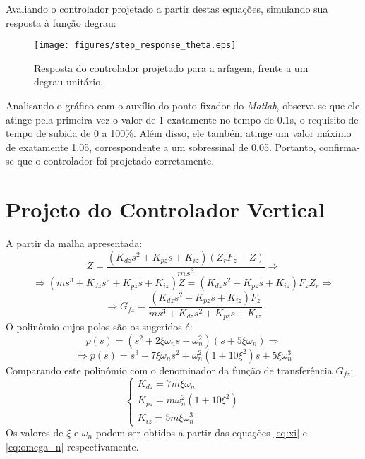 \documentclass[a4paper]{article}
\begin{document}
	Avaliando o controlador projetado a partir destas equa\c{c}\~oes, simulando sua resposta
	\`a fun\c{c}\~ao degrau:
	\begin{figure}[H]
		\centering
		\texttt{[image: figures/step\_response\_theta.eps]}
		\caption{Resposta do controlador projetado para a arfagem, frente a um degrau unit\'ario.}
	\end{figure}
	Analisando o gr\'afico com o aux\'ilio do ponto fixador do \textit{Matlab}, observa-se que
	ele atinge pela primeira vez o valor de 1 exatamente no tempo de 0.1s, o requisito de tempo
	de subida de 0 a 100\%. Al\'em disso, ele tamb\'em atinge um valor m\'aximo de exatamente
	1.05, correspondente a um sobressinal de 0.05. Portanto, confirma-se que o controlador
	foi projetado corretamente.
	\section{Projeto do Controlador Vertical}
	A partir da malha apresentada:
	\begin{equation}
		Z = \frac{(K_{dz}s^2 + K_{pz}s + K_{iz})(Z_rF_z - Z)}{ms^3} \Rightarrow
		\nonumber
	\end{equation}
	\begin{equation}
		\Rightarrow
		(ms^3 + K_{dz}s^2 + K_{pz}s + K_{iz})Z = (K_{dz}s^2 + K_{pz}s + K_{iz})F_zZ_r
		\Rightarrow
		\nonumber
	\end{equation}
	\begin{equation}
		\Rightarrow
		G_{fz} = \frac{(K_{dz}s^2 + K_{pz}s + K_{iz})F_z}{ms^3 + K_{dz}s^2 + K_{pz}s + K_{iz}}
		\nonumber
	\end{equation}
	O polin\^omio cujos polos s\~ao os sugeridos \'e:
	\begin{equation}
		p(s) = (s^2 + 2\xi\omega_ns + \omega_n^2)(s + 5\xi\omega_n) \Rightarrow
		\nonumber
	\end{equation}
	\begin{equation}
		\Rightarrow p(s) = s^3 + 7\xi\omega_ns^2 + \omega_n^2(1 + 10\xi^2)s + 5\xi\omega_n^3
		\nonumber
	\end{equation}
	Comparando este polin\^omio com o denominador da fun\c{c}\~ao de transfer\^encia $G_{fz}$:
	\begin{equation}
		\left\{\begin{array}{l}
			K_{dz} = 7m\xi\omega_n\\
			K_{pz} = m\omega_n^2(1 + 10\xi^2)\\
			K_{iz} = 5m\xi\omega_n^3
		\end{array}\right.
		\nonumber
	\end{equation}
	Os valores de $\xi$ e $\omega_n$ podem ser obtidos a partir das equa\c{c}\~oes \ref{eq:xi}
	e \ref{eq:omega_n} respectivamente.
\end{document}
